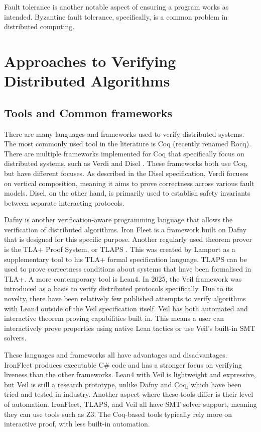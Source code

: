 \documentclass[acmsmall,screen,review]{acmart}
\begin{document}
  Fault tolerance is another notable aspect of ensuring a program works as intended.
  Byzantine fault tolerance, specifically, is a common problem in distributed computing.

\section{Approaches to Verifying Distributed Algorithms}
  \subsection{Tools and Common frameworks}
    There are many languages and frameworks used to verify distributed systems.
    The most commonly used tool in the literature is Coq (recently renamed Rocq).
    There are multiple frameworks implemented for Coq that specifically focus on distributed systems, 
    such as Verdi \cite{wilcoxVerdiFrameworkImplementing2015} and Disel \cite{sergeyProgrammingProvingDistributed2017}.
    These frameworks both use Coq, but have different focuses. 
    As described in the Disel specification, Verdi focuses on vertical composition, meaning it aims to prove correctness across various fault models.
    Disel, on the other hand, is primarily used to establish safety invariants between separate interacting protocols.

    Dafny is another verification-aware programming language that allows the verification of distributed algorithms.
    Iron Fleet \cite{hawblitzelIronFleetProvingPractical2015} is a framework built on Dafny that is designed for this specific purpose.
    Another regularly used theorem prover is the TLA+ Proof System, or TLAPS \cite{cousineau2012tla}. 
    This was created by Lamport as a supplementary tool to his TLA+ formal specification language.
    TLAPS can be used to prove correctness conditions about systems that have been formalised in TLA+.
    A more contemporary tool is Lean4.
    In 2025, the Veil \cite{pirleaVeilFrameworkAutomated2025a} framework was introduced as a basis to verify distributed protocols specifically.
    Due to its novelty, there have been relatively few published attempts to verify algorithms with Lean4 outside of the Veil specification itself.
    Veil has both automated and interactive theorem proving capabilities built in. 
    This means a user can interactively prove properties using native Lean tactics or use Veil's built-in SMT solvers.

    These languages and frameworks all have advantages and disadvantages.
    IronFleet produces executable C\# code and has a stronger focus on verifying liveness than the other frameworks.
    Lean4 with Veil is lightweight and expressive, but Veil is still a research prototype, unlike Dafny and Coq, which have been tried and tested in industry.
    Another aspect where these tools differ is their level of automation.
    IronFleet, TLAPS, and Veil all have SMT solver support, meaning they can use tools such as Z3.
    The Coq-based tools typically rely more on interactive proof, with less built-in automation.
\end{document}
